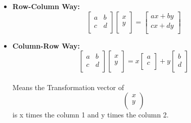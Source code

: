 \documentclass[a4paper,11pt]{article}
\numberwithin{equation}{section}
\begin{document}
\begin{itemize}
        \begin{itemize}
            \item \textbf{Row-Column Way:}\\
                \begin{equation}
                    \begin{bmatrix}
                        a & b \\
                        c & d \\
                    \end{bmatrix}
                    \begin{bmatrix}
                        x \\
                        y \\
                    \end{bmatrix}
                    =
                    \begin{bmatrix}
                        ax+by \\
                        cx+dy \\
                    \end{bmatrix}
                \end{equation}
            \item \textbf{Column-Row Way:}\\
                \begin{equation}
                    \begin{bmatrix}
                        a & b \\
                        c & d \\
                    \end{bmatrix}
                    \begin{bmatrix}
                        x \\
                        y \\
                    \end{bmatrix}
                    =
                        x
                        \begin{bmatrix}
                            a \\
                            c \\
                        \end{bmatrix}
                        +y
                        \begin{bmatrix}
                            b \\
                            d \\
                        \end{bmatrix}
                \end{equation}\\
            Means the Transformation vector of 
            \[
                \begin{pmatrix}
                    x \\
                    y \\
                \end{pmatrix}
            \] 
            is x times the column 1 and y times the column 2.
        \end{itemize}
    \end{itemize}
\end{document}
